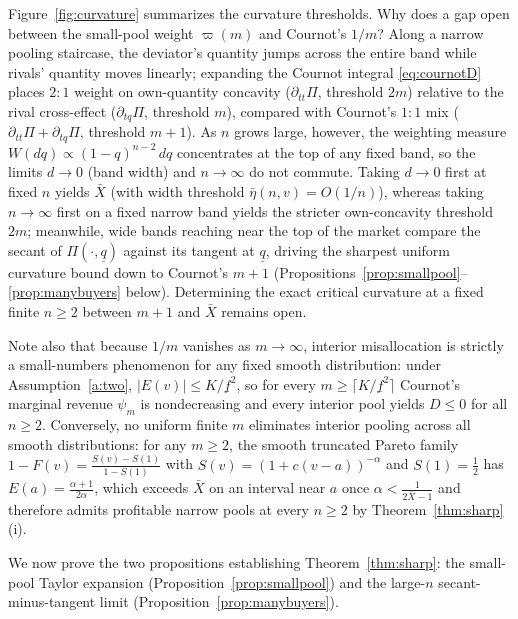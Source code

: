 \documentclass[12pt]{article}
\theoremstyle{mystyle}
\theoremstyle{mystyle2}
\newcommand{\1}{\mathbf{1}}
\begin{document}
Figure~\ref{fig:curvature} summarizes the curvature thresholds. Why does a gap open between the small-pool weight $\varpi(m)$ and Cournot's $1/m$? Along a narrow pooling staircase, the deviator's quantity jumps across the entire band while rivals' quantity moves linearly; expanding the Cournot integral \eqref{eq:cournotD} places $2:1$ weight on own-quantity concavity ($\partial_{tt}\Pi$, threshold $2m$) relative to the rival cross-effect ($\partial_{tq}\Pi$, threshold $m$), compared with Cournot's $1:1$ mix ($\partial_{tt}\Pi+\partial_{tq}\Pi$, threshold $m+1$). As $n$ grows large, however, the weighting measure $W(dq)\propto(1-q)^{n-2}\,dq$ concentrates at the top of any fixed band, so the limits $d\to 0$ (band width) and $n\to\infty$ do not commute. Taking $d\to 0$ first at fixed $n$ yields $\bar X$ (with width threshold $\bar\eta(n,v)=O(1/n)$), whereas taking $n\to\infty$ first on a fixed narrow band yields the stricter own-concavity threshold $2m$; meanwhile, wide bands reaching near the top of the market compare the secant of $\Pi(\cdot,\underline q)$ against its tangent at $\underline q$, driving the sharpest uniform curvature bound down to Cournot's $m+1$ (Propositions~\ref{prop:smallpool}--\ref{prop:manybuyers} below). Determining the exact critical curvature at a fixed finite $n\ge 2$ between $m+1$ and $\bar X$ remains open.

Note also that because $1/m$ vanishes as $m\to\infty$, interior misallocation is strictly a small-numbers phenomenon for any fixed smooth distribution: under Assumption~\ref{a:two}, $|E(v)|\le K/\underline f^2$, so for every $m\ge \lceil K/\underline f^2\rceil$ Cournot's marginal revenue $\psi_m$ is nondecreasing and every interior pool yields $D\le 0$ for all $n\ge 2$. Conversely, no uniform finite $m$ eliminates interior pooling across all smooth distributions: for any $m\ge 2$, the smooth truncated Pareto family $1-F(v)=\frac{S(v)-S(1)}{1-S(1)}$ with $S(v)=(1+c(v-a))^{-\alpha}$ and $S(1)=\frac{1}{2}$ has $E(a)=\frac{\alpha+1}{2\alpha}$, which exceeds $\bar X$ on an interval near $a$ once $\alpha<\frac{1}{2\bar X-1}$ and therefore admits profitable narrow pools at every $n\ge 2$ by Theorem~\ref{thm:sharp}(i).

We now prove the two propositions establishing Theorem~\ref{thm:sharp}: the small-pool Taylor expansion (Proposition~\ref{prop:smallpool}) and the large-$n$ secant-minus-tangent limit (Proposition~\ref{prop:manybuyers}).
\end{document}
